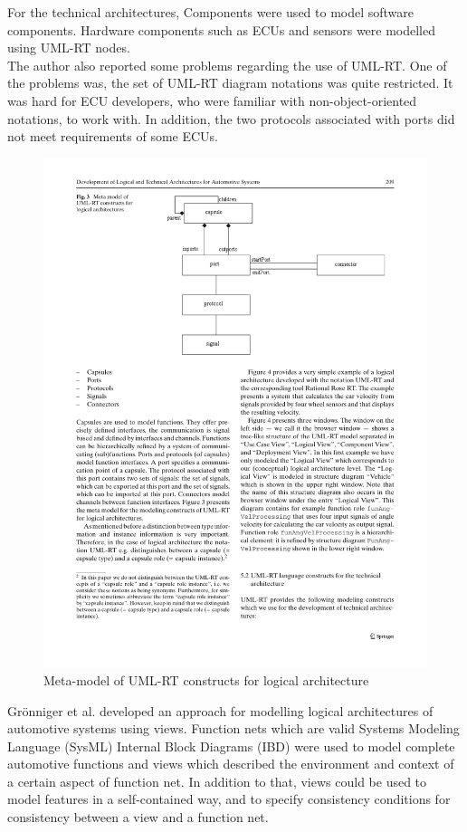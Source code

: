 For the technical architectures, Components were used to model software components. Hardware components such as ECUs and sensors were modelled using UML-RT nodes. \\

The author also reported some problems regarding the use of UML-RT. One of the problems was, the set of UML-RT diagram notations was quite restricted. It was hard for ECU developers, who were familiar with non-object-oriented notations, to work with. In addition, the two protocols associated with ports did not meet requirements of some ECUs.

\begin{figure}[H]
\centering
\captionsetup{justification=centering}
\vspace{0cm}%
\includegraphics[width=0.55\linewidth]{figure/literatures/beeck_metalmodel.pdf}
\caption{Meta-model of UML-RT constructs for logical architecture \cite{Beeck}}
\label{fig:beeck_metalmodel}
\end{figure}

Grönniger et al. \cite{Grönniger} developed an approach for modelling logical architectures of automotive systems using views. Function nets which are valid Systems Modeling Language (SysML) Internal Block Diagrams (IBD) were used to model complete automotive functions and views which described the environment and context of a certain aspect of function net. In addition to that, views could be used to model features in a self-contained way, and to specify consistency conditions for consistency between a view and a function net.\\

